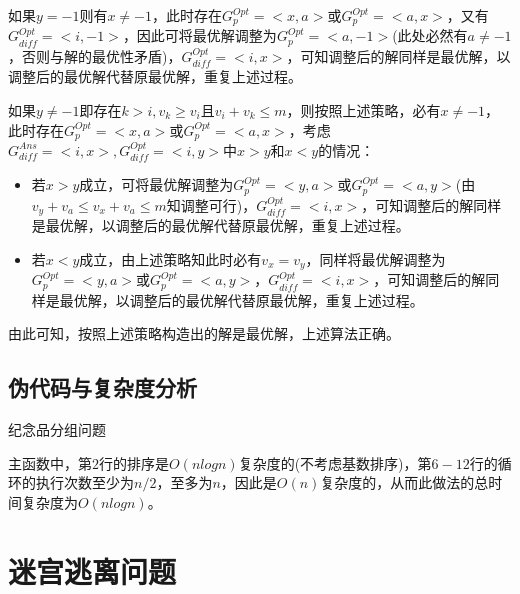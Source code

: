 \documentclass{article}
\begin{document}
如果$y=-1$则有$x\ne-1$，此时存在$G^{Opt}_{p}=<x,a>$或$G^{Opt}_{p}=<a,x>$，又有$G^{Opt}_{diff}=<i,-1>$，因此可将最优解调整为$G^{Opt}_{p}=<a,-1>$(此处必然有$a\ne-1$，否则与解的最优性矛盾)，$G^{Opt}_{diff}=<i,x>$，可知调整后的解同样是最优解，以调整后的最优解代替原最优解，重复上述过程。

如果$y\ne-1$即存在$k>i,v_k\ge{v}_i$且$v_i+v_k\le{m}$，则按照上述策略，必有$x\ne-1$，此时存在$G^{Opt}_{p}=<x,a>$或$G^{Opt}_{p}=<a,x>$，考虑$G^{Ans}_{diff}=<i,x>,G^{Opt}_{diff}=<i,y>$中$x>y$和$x<y$的情况：

\begin{itemize}[itemindent=3em]
    \item 若$x>y$成立，可将最优解调整为$G^{Opt}_{p}=<y,a>$或$G^{Opt}_{p}=<a,y>$(由$v_y+v_a\le{v}_x+v_a\le{m}$知调整可行)，$G^{Opt}_{diff}=<i,x>$，可知调整后的解同样是最优解，以调整后的最优解代替原最优解，重复上述过程。
    \item 若$x<y$成立，由上述策略知此时必有$v_x=v_y$，同样将最优解调整为$G^{Opt}_{p}=<y,a>$或$G^{Opt}_{p}=<a,y>$，$G^{Opt}_{diff}=<i,x>$，可知调整后的解同样是最优解，以调整后的最优解代替原最优解，重复上述过程。
\end{itemize}

由此可知，按照上述策略构造出的解是最优解，上述算法正确。

\subsection{伪代码与复杂度分析}

\begin{algorithm}[H]

\caption{纪念品分组问题}
\LinesNumbered
{}


\end{algorithm}

主函数中，第$2$行的排序是$O(n log n)$复杂度的(不考虑基数排序)，第$6-12$行的循环的执行次数至少为$n/2$，至多为$n$，因此是$O(n)$复杂度的，从而此做法的总时间复杂度为$O(n log n)$。

\section{迷宫逃离问题}
\end{document}
